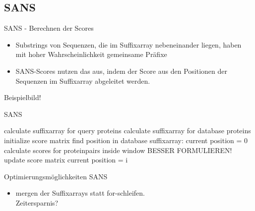 \documentclass[aspectratio=1610]{beamer}
\begin{document}
\subsection{SANS}

\begin{frame}{SANS - Berechnen der Scores}
  \begin{itemize}
    \item Substrings von Sequenzen, die im Suffixarray nebeneinander liegen, haben mit hoher Wahrscheinlichkeit gemeinsame Präfixe
    \item  SANS-Scores nutzen das aus, indem der Score aus den Positionen der Sequenzen im Suffixarray abgeleitet werden.
  \end{itemize}
  
  Beispielbild!
\end{frame}

\begin{frame}{SANS}
 \begin{algorithmic}
     \State calculate suffixarray for query proteins
     \State calculate suffixarray for database proteins
     \State initialize score matrix
       \State find position in database suffixarray:
       \State current position = 0
           \State calculate scores for proteinpairs inside window  BESSER FORMULIEREN!
           \State update score matrix 
           \State current position = i
         \EndIf
       \EndFor
     \EndFor
    \EndFunction
  \end{algorithmic} 
\end{frame}

\begin{frame}{Optimierungsmöglichkeiten SANS}
  \begin{itemize}
    \item mergen der Suffixarrays statt for-schleifen.\\
          Zeitersparnis?    
  \end{itemize}
\end{frame}
\end{document}
